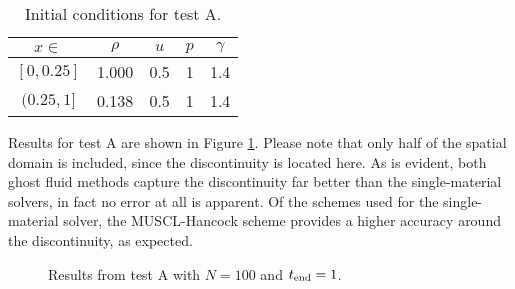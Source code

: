 \documentclass[final,3p,twocolumn]{elsarticle}
\begin{document}
\begin{table}[htb]
    \caption{Initial conditions for test A.}
    \label{tab:testA}
    \centering
    \begin{tabular}{ccccc}
        \hline
        $x \in $ & $\rho$ & $u$ & $p$ & $\gamma$ \\
        \hline
        $[0,0.25]$ & 1.000 & 0.5 & 1 & 1.4 \\
        $(0.25,1]$ & 0.138 & 0.5 & 1 & 1.4 \\
        \hline
    \end{tabular}
\end{table}

Results for test A are shown in Figure \ref{fig:testA}. Please note that only
half of the spatial domain is included, since the discontinuity is located
here. As is evident, both ghost fluid methods capture the discontinuity far
better than the single-material solvers, in fact no error at all is apparent.
Of the schemes used for the single-material solver, the MUSCL-Hancock scheme
provides a higher accuracy around the discontinuity, as expected. 


\begin{figure}[htb]
    \centering
    \caption[caption]
    {
        Results from test A with $N=100$ and $t_{\rm end}=1$. 
    }
    \label{fig:testA}
\end{figure}
\end{document}
